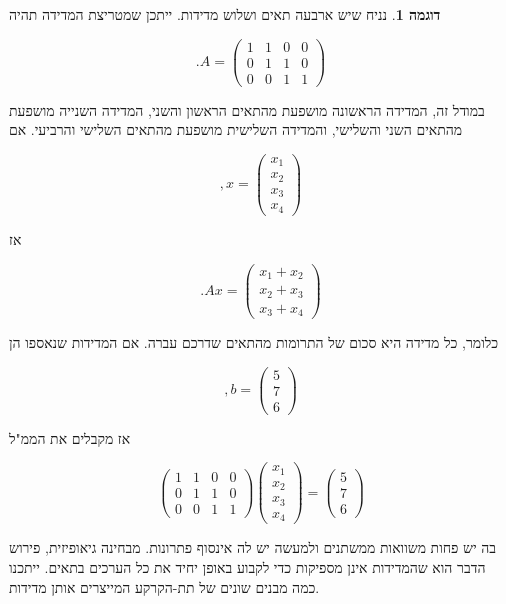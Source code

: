\documentclass[12pt]{report}
\theoremstyle{plain}
\theoremstyle{definition}
\newtheorem{example}{דוגמה}[chapter]
\newcommand{\0}{\mathbf{0}}
\begin{document}
\begin{example}
נניח שיש ארבעה תאים ושלוש מדידות.
ייתכן שמטריצת המדידה תהיה

$$
.A =
\begin{pmatrix}
1 & 1 & 0 & 0\\
0 & 1 & 1 & 0\\
0 & 0 & 1 & 1
\end{pmatrix}
$$

במודל זה, המדידה הראשונה מושפעת מהתאים הראשון והשני, המדידה השנייה מושפעת מהתאים השני והשלישי,
והמדידה השלישית מושפעת מהתאים השלישי והרביעי. אם

$$
,x =
\begin{pmatrix}
x_1\\
x_2\\
x_3\\
x_4
\end{pmatrix}
$$

אז

$$
.Ax =
\begin{pmatrix}
x_1+x_2\\
x_2+x_3\\
x_3+x_4
\end{pmatrix}
$$

כלומר, כל מדידה היא סכום של התרומות מהתאים שדרכם עברה. אם המדידות שנאספו הן

$$
,b =
\begin{pmatrix}
5\\
7\\
6
\end{pmatrix}
$$

אז מקבלים את הממ"ל

$$
\begin{pmatrix}
1 & 1 & 0 & 0\\
0 & 1 & 1 & 0\\
0 & 0 & 1 & 1
\end{pmatrix}
\begin{pmatrix}
x_1\\
x_2\\
x_3\\
x_4
\end{pmatrix}
=
\begin{pmatrix}
5\\
7\\
6
\end{pmatrix}
$$

בה יש פחות משוואות ממשתנים ולמעשה יש לה אינסוף פתרונות. מבחינה גיאופיזית, פירוש הדבר הוא שהמדידות אינן מספיקות כדי לקבוע באופן יחיד את כל הערכים בתאים.
ייתכנו כמה מבנים שונים של תת-הקרקע המייצרים אותן מדידות.

\end{example}
\end{document}
